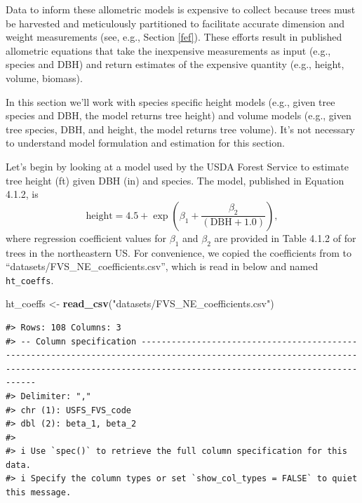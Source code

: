 \documentclass[
  11pt,
]{krantz}
\newenvironment{Shaded}{\begin{snugshade}}{\end{snugshade}}
\newcommand{\KeywordTok}[1]{\textcolor[rgb]{0.13,0.29,0.53}{\textbf{#1}}}
\newcommand{\NormalTok}[1]{#1}
\newcommand{\StringTok}[1]{\textcolor[rgb]{0.31,0.60,0.02}{#1}}
\theoremstyle{definition}
\theoremstyle{definition}
\theoremstyle{definition}
\theoremstyle{definition}
\theoremstyle{remark}
\begin{document}
Data to inform these allometric models is expensive to collect because trees must be harvested and meticulously partitioned to facilitate accurate dimension and weight measurements (see, e.g., Section \ref{fef}). These efforts result in published allometric equations that take the inexpensive measurements as input (e.g., species and DBH) and return estimates of the expensive quantity (e.g., height, volume, biomass).

In this section we'll work with species specific height models (e.g., given tree species and DBH, the model returns tree height) and volume models (e.g., given tree species, DBH, and height, the model returns tree volume). It's not necessary to understand model formulation and estimation for this section.

Let's begin by looking at a model used by the USDA Forest Service to estimate tree height (ft) given DBH (in) and species. The model, published in \citet{FVSNE} Equation 4.1.2, is
\begin{equation}
 \text{height} = 4.5 + \exp\left(\beta_1 + \frac{\beta_2}{\left(\text{DBH} + 1.0\right)} \right),
 \label{eq:wykoff}
\end{equation}
where regression coefficient values for \(\beta_1\) and \(\beta_2\) are provided in Table 4.1.2 of \citet{FVSNE} for trees in the northeastern US. For convenience, we copied the coefficients from \citet{FVSNE} to ``datasets/FVS\_NE\_coefficients.csv'', which is read in below and named \texttt{ht\_coeffs}.

\begin{Shaded}
\begin{Highlighting}[]
\NormalTok{ht\_coeffs \textless{}{-}}\StringTok{ }\KeywordTok{read\_csv}\NormalTok{(}\StringTok{"datasets/FVS\_NE\_coefficients.csv"}\NormalTok{)}
\end{Highlighting}
\end{Shaded}

\begin{verbatim}
#> Rows: 108 Columns: 3
#> -- Column specification ---------------------------------------------------------------------------------------------------------------------------------------------------------------------------------------------
#> Delimiter: ","
#> chr (1): USFS_FVS_code
#> dbl (2): beta_1, beta_2
#> 
#> i Use `spec()` to retrieve the full column specification for this data.
#> i Specify the column types or set `show_col_types = FALSE` to quiet this message.
\end{verbatim}
\end{document}
